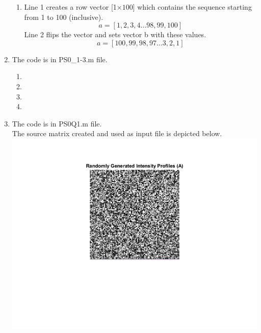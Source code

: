 \documentclass[man]{apa6}
\begin{document}
\begin{enumerate}
\begin{enumerate}
				\item Line 1 creates a row vector [1$\times100$] which contains the sequence starting from 1 to 100 (inclusive).
					$$a= [1,2,3,4 \dots 98,99,100]$$
					Line 2 flips the vector and sets vector b with these values.
					$$a= [100,99,98,97 \dots 3,2,1]$$	
			\end{enumerate}
		
		\item The code is in PS0\_1-3.m file.
			\begin{enumerate}
				\item 
				
				\item \item \item 
			\end{enumerate}
		
		\item The code is in PS0Q1.m file. \\
			The source matrix created and used as input file is depicted below. \\
			\includegraphics[width=\linewidth]{plots/1-A-4/a.png}
		

\end{enumerate}
\end{document}
